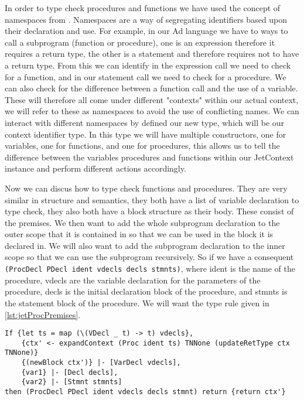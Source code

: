 In order to type check procedures and functions we have used the concept of namespaces from \textcite{grimm2007typical}.
Namespaces are a way of segregating identifiers based upon their declaration and use.
For example, in our Ad language we have to ways to call a subprogram (function or procedure), one is an expression therefore it requires a return type, the other is a statement and therefore requires not to have a return type.
From this we can identify in the expression call we need to check for a function, and in our statement call we need to check for a procedure.
We can also check for the difference between a function call and the use of a variable.
These will therefore all come under different "contexts" within our actual context, we will refer to these as namespaces to avoid the use of conflicting names.
We can interact with different namespaces by defined our new type, which will be our context identifier type.
In this type we will have multiple constructors, one for variables, one for functions, and one for procedures, this allows us to tell the difference between the variables procedures and functions within our JetContext instance and perform different actions accordingly.

Now we can discus how to type check functions and procedures.
They are very similar in structure and semantics, they both have a list of variable declaration to type check, they also both have a block structure as their body.
These consist of the premises.
We then want to add the whole subprogram declaration to the outer scope that it is contained in so that we can be used in the block it is declared in.
We will also want to add the subprogram declaration to the inner scope so that we can use the subprogram recursively.
So if we have a consequent \texttt{(ProcDecl PDecl ident vdecls decls stmnts)}, where ident is the name of the procedure, vdecls are the variable declaration for the parameters of the procedure, decls is the initial declaration block of the procedure, and stmnts is the statement block of the procedure.
We will want the type rule given in \autoref{lst:jetProcPremises}.
\begin{lstlisting}[caption = Jet premise list for procedures., label=lst:jetProcPremises]
If {let ts = map (\(VDecl _ t) -> t) vdecls},
    {ctx' <- expandContext (Proc ident ts) TNNone (updateRetType ctx TNNone)}
    {(newBlock ctx')} |- [VarDecl vdecls], 
    {var1} |- [Decl decls], 
    {var2} |- [Stmnt stmnts]
then (ProcDecl PDecl ident vdecls decls stmnt) return {return ctx'}
\end{lstlisting}

